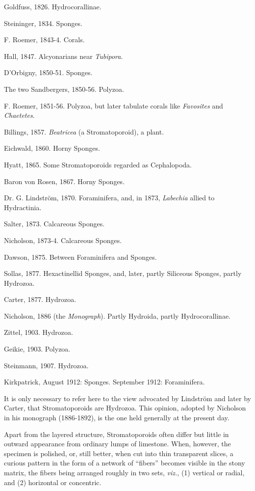 \documentclass[a4paper, 12pt, oneside]{article}
\begin{document}
Goldfuss, 1826. Hydrocorallinae.

Steininger, 1834. Sponges.

F. Roemer, 1843-4. Corals.

Hall, 1847. Alcyonarians near \emph{Tubipora}.

D'Orbigny, 1850-51. Sponges.

The two Sandbergers, 1850-56. Polyzoa.

F. Roemer, 1851-56. Polyzoa, but later tabulate corals like \emph{Favosites} and \emph{Chaetetes}.

Billings, 1857. \emph{Beatricea} (a Stromatoporoid), a plant.

Eichwald, 1860. Horny Sponges.

Hyatt, 1865. Some Stromatoporoids regarded as Cephalopoda.

Baron von Rosen, 1867. Horny Sponges.

Dr. G. Lindström, 1870. Foraminifera, and, in 1873, \emph{Labechia} allied to Hydractinia.

Salter, 1873. Calcareous Sponges.

Nicholson, 1873-4. Calcareous Sponges.

Dawson, 1875. Between Foraminifera and Sponges.

Sollas, 1877. Hexactinellid Sponges, and, later, partly Siliceous Sponges, partly Hydrozoa.

Carter, 1877. Hydrozoa.

Nicholson, 1886 (the \emph{Monograph}). Partly Hydroida, partly Hydrocorallinae.

Zittel, 1903. Hydrozoa.

Geikie, 1903. Polyzoa.

Steinmann, 1907. Hydrozoa.

Kirkpatrick, August 1912: Sponges. September 1912: Foraminifera.

It is only necessary to refer here to the view advocated by Lindström and later by Carter, that Stromatoporoids are Hydrozoa. This opinion, adopted by Nicholson in his monograph (1886-1892), is the one held generally at the present day.

Apart from the layered structure, Stromatoporoids often differ but little in outward appearance from ordinary lumps of limestone. When, however, the specimen is polished, or, still better, when cut into thin transparent slices, a curious pattern in the form of a network of ``fibers'' becomes visible in the stony matrix, the fibers being arranged roughly in two sets, \emph{viz.}, (1) vertical or radial, and (2) horizontal or concentric.
\end{document}
